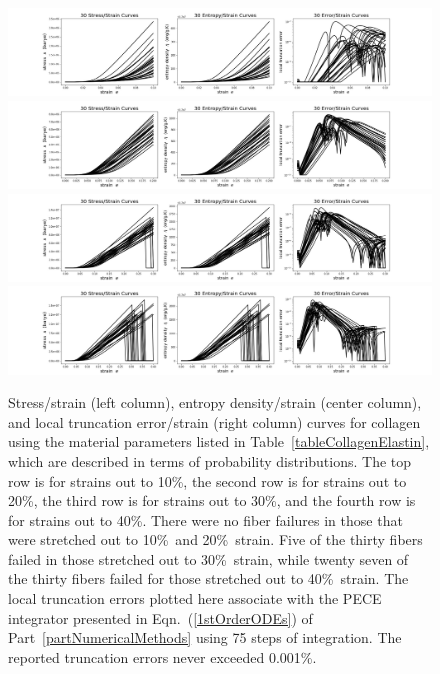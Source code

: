 \begin{figure}
    \mbox{}\hspace{-1.5cm}
    \includegraphics[width=1.2\textwidth]{figures/bioFibers10.jpg}
    \mbox{}\hspace{-1.5cm}
    \includegraphics[width=1.2\textwidth]{figures/bioFibers20.jpg}
    \mbox{}\hspace{-1.5cm}
    \includegraphics[width=1.2\textwidth]{figures/bioFibers30.jpg}
    \mbox{}\hspace{-1.5cm}
    \includegraphics[width=1.2\textwidth]{figures/bioFibers40.jpg}
    \caption{Stress\slash strain (left column), entropy density\slash strain (center column), and local truncation error\slash strain (right column) curves for collagen using the material parameters listed in Table~\ref{tableCollagenElastin}, which are described in terms of probability distributions.  The top row is for strains out to 10\%, the second row is for strains out to 20\%, the third row is for strains out to 30\%, and the fourth row is for strains out to 40\%.  There were no fiber failures in those that were stretched out to 10\%\ and 20\%\ strain.  Five of the thirty fibers failed in those stretched out to 30\%\ strain, while twenty seven of the thirty fibers failed for those stretched out to 40\%\ strain.  The local truncation errors plotted here associate with the PECE integrator presented in Eqn.~(\ref{1stOrderODEs}) of Part~\ref{partNumericalMethods} using 75 steps of integration.  The reported truncation errors never exceeded 0.001\%.}
    \label{figCollagenFiber}
\end{figure}

